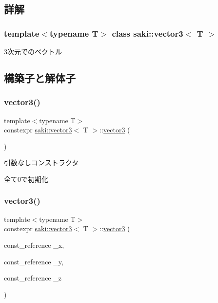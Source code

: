 \subsection{詳解}
\subsubsection*{template$<$typename T$>$\newline
class saki\+::vector3$<$ T $>$}

3次元でのベクトル 

\subsection{構築子と解体子}
\mbox{\label{classsaki_1_1vector3_af8c424a90ac24c595f7f9f74c74a9db3}} 
\subsubsection{\texorpdfstring{vector3()}{vector3()}\hspace{0.1cm}{\footnotesize\ttfamily [1/5]}}
{\footnotesize\ttfamily template$<$typename T$>$ \\
constexpr \mbox{\hyperlink{classsaki_1_1vector3}{saki\+::vector3}}$<$ T $>$\+::\mbox{\hyperlink{classsaki_1_1vector3}{vector3}} (\begin{DoxyParamCaption}{ }\end{DoxyParamCaption})\hspace{0.3cm}{\ttfamily [inline]}}



引数なしコンストラクタ 

全て0で初期化 \mbox{\label{classsaki_1_1vector3_a2ac12ac3883e0d3eced195d84268e2dc}} 
\subsubsection{\texorpdfstring{vector3()}{vector3()}\hspace{0.1cm}{\footnotesize\ttfamily [2/5]}}
{\footnotesize\ttfamily template$<$typename T$>$ \\
constexpr \mbox{\hyperlink{classsaki_1_1vector3}{saki\+::vector3}}$<$ T $>$\+::\mbox{\hyperlink{classsaki_1_1vector3}{vector3}} (\begin{DoxyParamCaption}\item[{const\+\_\+reference}]{\+\_\+x,  }\item[{const\+\_\+reference}]{\+\_\+y,  }\item[{const\+\_\+reference}]{\+\_\+z }\end{DoxyParamCaption})\hspace{0.3cm}{\ttfamily [inline]}}




